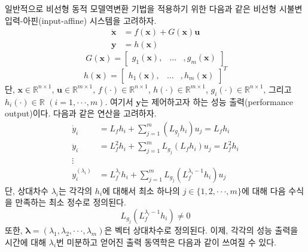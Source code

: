 \documentclass[a4paper, 12pt]{report}
\begin{document}
	일반적으로 비선형 동적 모델역변환 기법을 적용하기 위한 다음과 같은 비선형 시불변 입력-아핀(input-affine) 시스템을 고려하자.
	\begin{equation}\label{Eq:NDI_sys}
		\begin{split}
			\dot{\mathbf{x}} &= f(\mathbf{x}) + G(\mathbf{x})\mathbf{u} \\
			\mathbf{y} &= h(\mathbf{x})
		\end{split}
	\end{equation}
	\begin{equation}\label{Eq:InputMTRX}
		G(\mathbf{x}) =
		\begin{bmatrix}
			g_{1}(\mathbf{x}), & \dots & ,g_{m}(\mathbf{x})
		\end{bmatrix}
	\end{equation}
	\begin{equation}\label{Eq:outputMTRX}
		h(\mathbf{x}) =
		\begin{bmatrix}
			h_{1}(\mathbf{x}), & \dots & ,h_{m}(\mathbf{x})
		\end{bmatrix}^{T}
	\end{equation}
	단, $\mathbf{x} \in \mathbb{R}^{n\times1}$, $\mathbf{u} \in \mathbb{R}^{m\times1}$, $f(\cdot) \in \mathbb{R}^{n\times1}$, $h(\cdot) \in \mathbb{R}^{m\times1}$, $g_{i}(\cdot) \in \mathbb{R}^{n\times1}$, 그리고 $h_{i}(\cdot) \in \mathbb{R}\,\,(i=1,\cdot\cdot\cdot,m)$. 여기서 $\mathbf{y}$는 제어하고자 하는 성능 출력(performance output)이다. 다음과 같은 연산을 고려하자.
	\begin{equation}\label{Eq:output_dere}
		\begin{split}
			\dot{y}_{i} &= L_{f}h_{i} + \sum_{j=1}^{m}( L_{g_{j}}h_{i} )u_{j} = L_{f}h_{i} \\
			\ddot{y}_{i} &= L_{f}^{2}h_{i} + \sum_{j=1}^{m}L_{g_{j}}( L_{f}h_{i} )u_{j} = L_{f}^{2}h_{i} \\
			\vdots  \\
			y_{i}^{(\lambda_{i})} &= L_{f}^{\lambda_{i}}h_{i} + \sum_{j=1}^{m}L_{g_{j}}( L_{f}^{\lambda_{i}-1}h_{i} )u_{j}
		\end{split}
	\end{equation}
	단, 상대차수 $\lambda_{i}$는 각각의 $h_{i}$에 대해서 최소 하나의 $j \in \{1,2,\cdot\cdot\cdot,m\}$에 대해 다음 수식을 만족하는 최소 정수로 정의된다.
	\begin{equation}\label{Eq:rela_deg_cond}
		L_{g_{j}}( L_{f}^{\lambda_{i}-1}h_{i} ) \neq 0
	\end{equation}
	또한, $\boldsymbol{\lambda}=(\lambda_{1},\lambda_{2},\cdot\cdot\cdot,\lambda_{m})$은 벡터 상대차수로 정의된다. 이제, 각각의 성능 출력을 시간에 대해 $\lambda_{i}$번 미분하고 얻어진 출력 동역학은 다음과 같이 쓰여질 수 있다.
\end{document}
